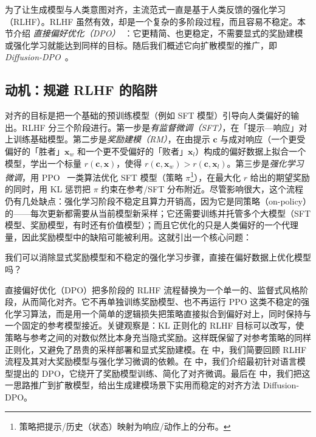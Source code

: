 为了让生成模型与人类意图对齐，主流范式一直是基于人类反馈的强化学习（RLHF）。RLHF 虽然有效，却是一个复杂的多阶段过程，而且容易不稳定。本节介绍 \emph{直接偏好优化（DPO）}~\citep{rafailov2023direct}：它更精简、也更稳定，不需要显式的奖励建模或强化学习就能达到同样的目标。随后我们概述它向扩散模型的推广，即 \emph{Diffusion-DPO}~\citep{wallace2024diffusion}。

\subsection{动机：规避 RLHF 的陷阱}

对齐的目标是把一个基础的预训练模型（例如 SFT 模型）引导向人类偏好的输出。RLHF 分三个阶段进行。第一步是\emph{有监督微调（SFT）}，在「提示—响应」对上训练基础模型。第二步是\emph{奖励建模（RM）}，在由提示 $\mathbf{c}$ 与成对响应（一个更受偏好的「胜者」$\mathbf{x}_w$ 和一个更不受偏好的「败者」$\mathbf{x}_l$）构成的偏好数据上拟合一个模型，学出一个标量 $r(\mathbf{c},\mathbf{x})$，使得 $r(\mathbf{c},\mathbf{x}_w)>r(\mathbf{c},\mathbf{x}_l)$。第三步是\emph{强化学习微调}，用 PPO~\citep{schulman2017proximal} 一类算法优化 SFT 模型（策略 $\pi$\footnote{策略把提示/历史（状态）映射为响应/动作上的分布。}），在最大化 $r$ 给出的期望奖励的同时，用 KL 惩罚把 $\pi$ 约束在参考/SFT 分布附近。尽管影响很大，这个流程仍有几处缺点：强化学习阶段不稳定且算力开销高，因为它是同策略（on-policy）的——每次更新都需要从当前模型新采样；它还需要训练并托管多个大模型（SFT 模型、奖励模型，有时还有价值模型）；而且它优化的只是人类偏好的一个代理量，因此奖励模型中的缺陷可能被利用。这就引出一个核心问题：
\begin{question}
    我们可以消除显式奖励模型和不稳定的强化学习步骤，直接在偏好数据上优化模型吗？
\end{question}

直接偏好优化（DPO）把多阶段的 RLHF 流程替换为一个单一的、监督式风格阶段，从而简化对齐。它不再单独训练奖励模型、也不再运行 PPO 这类不稳定的强化学习算法，而是用一个简单的逻辑损失把策略直接拟合到偏好对上，同时保持与一个固定的参考模型接近。关键观察是：KL 正则化的 RLHF 目标可以改写，使策略与参考之间的对数似然比本身充当隐式奖励。这样既保留了对参考策略的同样正则化，又避免了昂贵的采样部署和显式奖励建模。在  中，我们简要回顾 RLHF 流程及其对大奖励模型与强化学习微调的依赖。在  中，我们介绍最初针对语言模型提出的 DPO，它绕开了奖励模型训练、简化了对齐微调。最后在  中，我们把这一思路推广到扩散模型，给出生成建模场景下实用而稳定的对齐方法 Diffusion-DPO。

